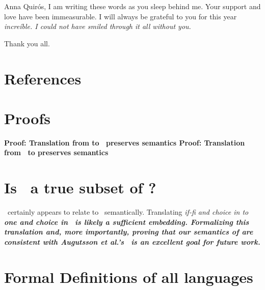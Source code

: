 \documentclass[manuscript,screen,review, 12pt, nonacm]{acmart}
\begin{document}
Anna Quirós, I am writing these words as you sleep behind me. Your support
and love have been immeasurable. I will always be grateful to you for this
year \it{increíble}. I could not have smiled through it all without you. 

Thank you all. 

\section{References}



\renewcommand\thesection{\Alph{section}}
\setcounter{section}{0}
\section{Proofs}
\begin{outline}
\1 \bf{Proof: Translation from \VMinus to \D\ preserves semantics }
\1 \bf{Proof: Translation from \PPlus\ to \VMinus preserves semantics }
\end{outline}

\section{Is \VMinus\ a true subset of \VC?}
\VMinus\ certainly appears to relate to \VC\ semantically. Translating
\it{if-fi} and choice in \VMinus to \bf{one} and choice in \VC\ is likely a
sufficient embedding. Formalizing this translation and, more importantly,
proving that our semantics of \VMinus are consistent with Augutsson et al.'s
\VC\ is an excellent goal for future work. 

\section{Formal Definitions of all languages}

\utable
\ppsemantics
\vmsemantics
\end{document}
